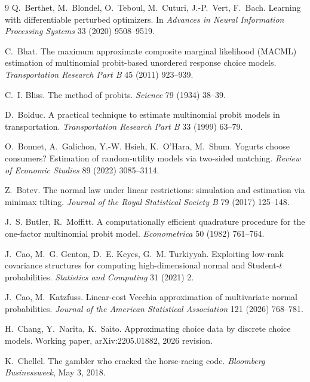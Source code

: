 \documentclass[12pt]{article}
\theoremstyle{remark}
\begin{document}
\begin{thebibliography}{9}
 Q.~Berthet, M.~Blondel, O.~Teboul, M.~Cuturi,
J.-P.~Vert, F.~Bach. Learning with differentiable perturbed optimizers. In
\emph{Advances in Neural Information Processing Systems} 33 (2020)
9508--9519.

 C.~Bhat. The maximum approximate composite marginal
likelihood (MACML) estimation of multinomial probit-based unordered response
choice models. \emph{Transportation Research Part B} 45 (2011) 923--939.

 C.~I. Bliss. The method of probits.
\emph{Science} 79 (1934) 38--39.

 D.~Bolduc. A practical technique to
estimate multinomial probit models in transportation. \emph{Transportation
Research Part B} 33 (1999) 63--79.

 O.~Bonnet, A.~Galichon, Y.-W. Hsieh, K.~O'Hara,
M.~Shum. Yogurts choose consumers? Estimation of random-utility models
via two-sided matching. \emph{Review of Economic Studies} 89 (2022)
3085--3114.

 Z.~Botev. The normal law under linear restrictions:
simulation and estimation via minimax tilting. \emph{Journal of the
Royal Statistical Society B} 79 (2017)
125--148.

 J.~S. Butler, R.~Moffitt. A computationally efficient
quadrature procedure for the one-factor multinomial probit model.
\emph{Econometrica} 50 (1982) 761--764.

 J.~Cao, M.~G. Genton, D.~E. Keyes, G.~M. Turkiyyah.
Exploiting low-rank covariance structures for computing high-dimensional
normal and Student-$t$ probabilities. \emph{Statistics and Computing} 31
(2021) 2.

 J.~Cao, M.~Katzfuss.
Linear-cost Vecchia approximation of multivariate normal probabilities.
\emph{Journal of the American Statistical Association} 121 (2026)
768--781.

H.~Chang, Y.~Narita, K.~Saito. Approximating choice data by discrete
choice models. Working paper, arXiv:2205.01882, 2026 revision.

 K.~Chellel. The gambler who
cracked the horse-racing code. \emph{Bloomberg Businessweek}, May 3,
2018.


\end{thebibliography}
\end{document}
